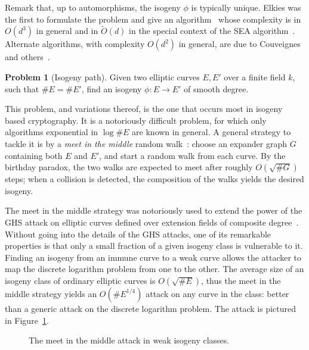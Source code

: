 \documentclass[10pt]{article}
\theoremstyle{plain}
\theoremstyle{definition}
\newtheorem{problem}{Problem}
\def\tildO{\ensuremath{\tilde{O}}}
\begin{document}
Remark that, up to automorphisms, the isogeny $ϕ$ is typically
unique. %
Elkies was the first to formulate the problem and give an
algorithm~\cite{elkies92,elkies98} whose complexity is in $O(d^3)$ in
general and in $\tildO(d)$ in the special context of the SEA
algorithm~\cite{bostan+morain+salvy+schost08,lercier+sirvent08}. %
Alternate algorithms, with complexity $O(d^2)$ in general, are due to
Couveignes and
others~\cite{couveignes94,couveignes96,couveignes00,df+schost09,defeo2016explicit}.

\begin{problem}[Isogeny path]
  Given two elliptic curves $E,E'$ over a finite field $k$, such that
  $\#E=\#E'$, find an isogeny $ϕ:E\to E'$ of smooth degree.
\end{problem}

This problem, and variations thereof, is the one that occurs most in
isogeny based cryptography. %
It is a notoriously difficult problem, for which only algorithms
exponential in $\log\#E$ are known in general. %
A general strategy to tackle it is by a \emph{meet in the middle}
random walk~\cite{galbraith99}: choose an expander graph $G$
containing both $E$ and $E'$, and start a random walk from each
curve. %
By the birthday paradox, the two walks are expected to meet after
roughly $O(\sqrt{\#G})$ steps; when a collision is detected, the 
composition of the walks yields the desired isogeny.

The meet in the middle strategy was notoriously used to extend the
power of the GHS attack on elliptic curves defined over extension
fields of composite degree~\cite{gaudry+hess+smart02,GHS}. %
Without going into the details of the GHS attacks, one of its
remarkable properties is that only a small fraction of a given isogeny
class is vulnerable to it. %
Finding an isogeny from an immune curve to a weak curve allows the
attacker to map the discrete logarithm problem from one to the
other. %
The average size of an isogeny class of ordinary elliptic curves is
$O(\sqrt{\#E})$, thus the meet in the middle strategy yields an
$O(\#E^{1/4})$ attack on any curve in the class: better than a generic
attack on the discrete logarithm problem. %
The attack is pictured in Figure~\ref{fig:ghs}.

\begin{figure}
  \centering
  \caption{The meet in the middle attack in weak isogeny classes.}
  \label{fig:ghs}
\end{figure}
\end{document}
